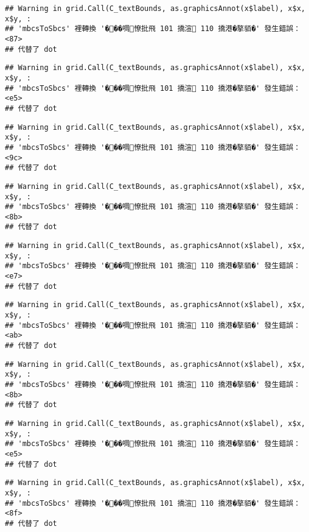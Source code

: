 \documentclass[
]{article}
\begin{document}
\begin{verbatim}
## Warning in grid.Call(C_textBounds, as.graphicsAnnot(x$label), x$x, x$y, :
## 'mbcsToSbcs' 裡轉換 '���啁憭批飛 101 撟渲 110 撟港�摮貊�' 發生錯誤：<87>
## 代替了 dot
\end{verbatim}

\begin{verbatim}
## Warning in grid.Call(C_textBounds, as.graphicsAnnot(x$label), x$x, x$y, :
## 'mbcsToSbcs' 裡轉換 '���啁憭批飛 101 撟渲 110 撟港�摮貊�' 發生錯誤：<e5>
## 代替了 dot
\end{verbatim}

\begin{verbatim}
## Warning in grid.Call(C_textBounds, as.graphicsAnnot(x$label), x$x, x$y, :
## 'mbcsToSbcs' 裡轉換 '���啁憭批飛 101 撟渲 110 撟港�摮貊�' 發生錯誤：<9c>
## 代替了 dot
\end{verbatim}

\begin{verbatim}
## Warning in grid.Call(C_textBounds, as.graphicsAnnot(x$label), x$x, x$y, :
## 'mbcsToSbcs' 裡轉換 '���啁憭批飛 101 撟渲 110 撟港�摮貊�' 發生錯誤：<8b>
## 代替了 dot
\end{verbatim}

\begin{verbatim}
## Warning in grid.Call(C_textBounds, as.graphicsAnnot(x$label), x$x, x$y, :
## 'mbcsToSbcs' 裡轉換 '���啁憭批飛 101 撟渲 110 撟港�摮貊�' 發生錯誤：<e7>
## 代替了 dot
\end{verbatim}

\begin{verbatim}
## Warning in grid.Call(C_textBounds, as.graphicsAnnot(x$label), x$x, x$y, :
## 'mbcsToSbcs' 裡轉換 '���啁憭批飛 101 撟渲 110 撟港�摮貊�' 發生錯誤：<ab>
## 代替了 dot
\end{verbatim}

\begin{verbatim}
## Warning in grid.Call(C_textBounds, as.graphicsAnnot(x$label), x$x, x$y, :
## 'mbcsToSbcs' 裡轉換 '���啁憭批飛 101 撟渲 110 撟港�摮貊�' 發生錯誤：<8b>
## 代替了 dot
\end{verbatim}

\begin{verbatim}
## Warning in grid.Call(C_textBounds, as.graphicsAnnot(x$label), x$x, x$y, :
## 'mbcsToSbcs' 裡轉換 '���啁憭批飛 101 撟渲 110 撟港�摮貊�' 發生錯誤：<e5>
## 代替了 dot
\end{verbatim}

\begin{verbatim}
## Warning in grid.Call(C_textBounds, as.graphicsAnnot(x$label), x$x, x$y, :
## 'mbcsToSbcs' 裡轉換 '���啁憭批飛 101 撟渲 110 撟港�摮貊�' 發生錯誤：<8f>
## 代替了 dot
\end{verbatim}
\end{document}
